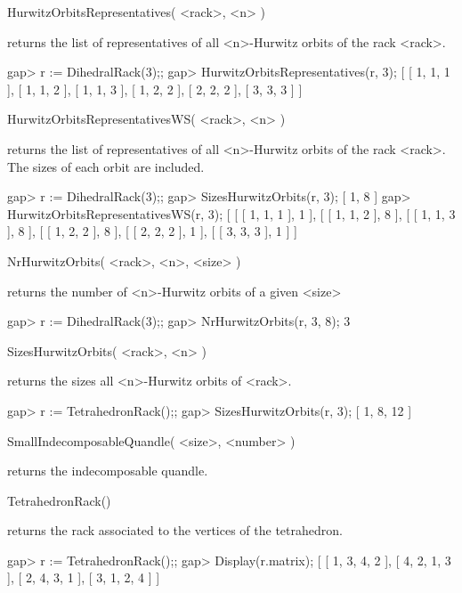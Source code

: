 \>HurwitzOrbitsRepresentatives( <rack>, <n> )

returns the list of representatives of all <n>-Hurwitz orbits of the rack <rack>.

\beginexample
gap> r := DihedralRack(3);;
gap> HurwitzOrbitsRepresentatives(r, 3);
[ [ 1, 1, 1 ], [ 1, 1, 2 ], [ 1, 1, 3 ], [ 1, 2, 2 ], [ 2, 2, 2 ], [ 3, 3, 3 ] ]
\endexample

\>HurwitzOrbitsRepresentativesWS( <rack>, <n> )

returns the list of representatives of all <n>-Hurwitz orbits of the rack
<rack>. The sizes of each orbit are included.

\beginexample
gap> r := DihedralRack(3);;
gap> SizesHurwitzOrbits(r, 3);
[ 1, 8 ]
gap> HurwitzOrbitsRepresentativesWS(r, 3);
[ [ [ 1, 1, 1 ], 1 ], [ [ 1, 1, 2 ], 8 ], [ [ 1, 1, 3 ], 8 ], [ [ 1, 2, 2 ], 8 ], [ [ 2, 2, 2 ], 1 ], [ [ 3, 3, 3 ], 1 ] ]
\endexample

\>NrHurwitzOrbits( <rack>, <n>, <size> )

returns the number of <n>-Hurwitz orbits of a given <size>

\beginexample
gap> r := DihedralRack(3);;
gap> NrHurwitzOrbits(r, 3, 8);
3
\endexample

\>SizesHurwitzOrbits( <rack>, <n> )

returns the sizes all <n>-Hurwitz orbits of <rack>.

\beginexample
gap> r := TetrahedronRack();;
gap> SizesHurwitzOrbits(r, 3);
[ 1, 8, 12 ]
\endexample

\>SmallIndecomposableQuandle( <size>, <number> )

returns the indecomposable quandle.

\>TetrahedronRack()

returns the rack associated to the vertices of the tetrahedron.

\beginexample
gap> r := TetrahedronRack();;
gap> Display(r.matrix);
[ [  1,  3,  4,  2 ],
  [  4,  2,  1,  3 ],
  [  2,  4,  3,  1 ],
  [  3,  1,  2,  4 ] ]
\endexample


